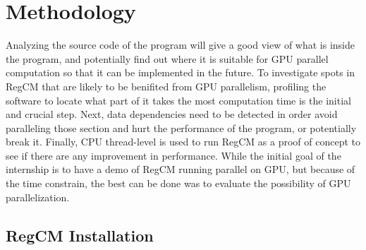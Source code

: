 \chapter{Methodology}

Analyzing the source code of the program will give a good view of what is inside the program, and potentially find out where it is suitable for GPU parallel computation so that it can be implemented in the future. To investigate spots in RegCM that are likely to be benifited from GPU parallelism, profiling the software to locate what part of it takes the most computation time is the initial and crucial step. Next, data dependencies need to be detected in order avoid paralleling those section and hurt the performance of the program, or potentially break it. Finally, CPU thread-level is used to run RegCM as a proof of concept to see if there are any improvement in performance. While the initial goal of the internship is to have a demo of RegCM running parallel on GPU, but because of the time constrain, the best can be done was to evaluate the possibility of GPU parallelization. \\

\section{RegCM Installation}

